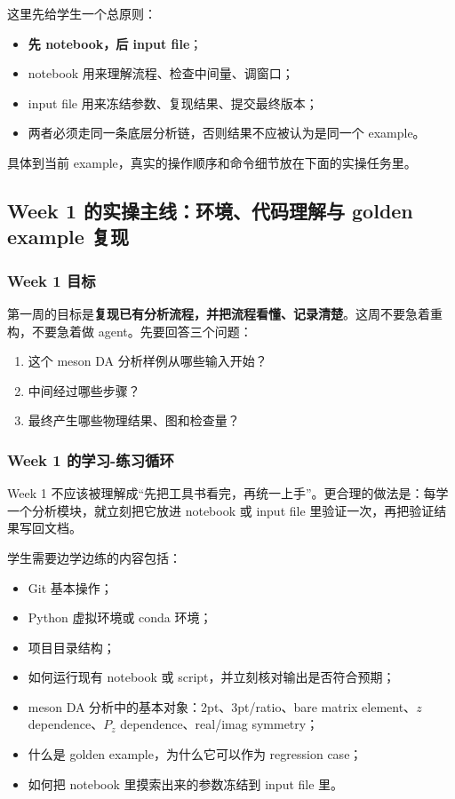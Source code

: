 \documentclass[11pt,a4paper,fontset=fandol]{ctexart}
\begin{document}
这里先给学生一个总原则：

\begin{itemize}[leftmargin=2em]
  \item \textbf{先 notebook，后 input file}；
  \item notebook 用来理解流程、检查中间量、调窗口；
  \item input file 用来冻结参数、复现结果、提交最终版本；
  \item 两者必须走同一条底层分析链，否则结果不应被认为是同一个 example。
\end{itemize}

具体到当前 example，真实的操作顺序和命令细节放在下面的实操任务里。

\subsection{Week 1 的实操主线：环境、代码理解与 golden example 复现}

\subsubsection{Week 1 目标}

第一周的目标是\textbf{复现已有分析流程，并把流程看懂、记录清楚}。这周不要急着重构，不要急着做 agent。先要回答三个问题：

\begin{enumerate}[leftmargin=2em]
  \item 这个 meson DA 分析样例从哪些输入开始？
  \item 中间经过哪些步骤？
  \item 最终产生哪些物理结果、图和检查量？
\end{enumerate}

\subsubsection{Week 1 的学习-练习循环}

Week 1 不应该被理解成“先把工具书看完，再统一上手”。更合理的做法是：每学一个分析模块，就立刻把它放进 notebook 或 input file 里验证一次，再把验证结果写回文档。

学生需要边学边练的内容包括：

\begin{itemize}[leftmargin=2em]
  \item Git 基本操作；
  \item Python 虚拟环境或 conda 环境；
  \item 项目目录结构；
  \item 如何运行现有 notebook 或 script，并立刻核对输出是否符合预期；
  \item meson DA 分析中的基本对象：2pt、3pt/ratio、bare matrix element、$z$ dependence、$P_z$ dependence、real/imag symmetry；
  \item 什么是 golden example，为什么它可以作为 regression case；
  \item 如何把 notebook 里摸索出来的参数冻结到 input file 里。
\end{itemize}
\end{document}
